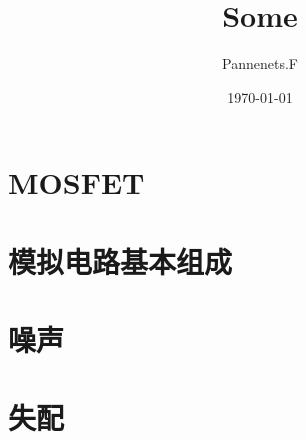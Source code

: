 \documentclass[en,11pt,english,black,simple,device=ppt]{elegantbook}
\title{Some}
\author{Pannenets.F}
\date{\today}
\begin{document}
\maketitle
\frontmatter

\section{MOSFET}




\section{模拟电路基本组成}



\section{噪声}



\section{失配}



\mainmatter
\end{document}
